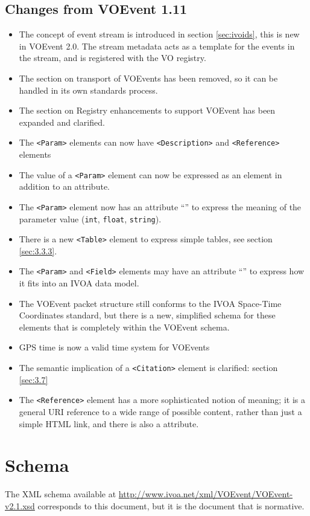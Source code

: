 \documentclass[11pt,a4paper]{ivoa}
\begin{document}
\subsection{Changes from VOEvent 1.11}
\begin{itemize}
\item The concept of event stream is introduced in section \ref{sec:ivoids}, this
is new in VOEvent 2.0. The stream metadata acts as a template for the events in
the stream, and is registered with the VO registry.
\item The section on transport of VOEvents has been removed, so it can be
handled in its own standards process.
\item The section on Registry enhancements to support VOEvent has been expanded
and clarified.
\item The \verb|<Param>| elements can now have \verb|<Description>| and
\verb|<Reference>| elements
\item The value of a \verb|<Param>| element can now be expressed as an element
in addition to an attribute.
\item The \verb|<Param>| element now has an attribute ``'' to
express the meaning of the parameter value (\texttt{int}, \texttt{float}, \texttt{string}).
\item There is a new \verb|<Table>| element to express simple tables, see section
\ref{sec:3.3.3}.
\item The \verb|<Param>| and \verb|<Field>| elements may have an attribute
``'' to express how it fits into an IVOA data model.
\item The VOEvent packet structure still conforms to the IVOA Space-Time
Coordinates standard, but there is a new, simplified schema for these elements
that is completely within the VOEvent schema.
\item GPS time is now a valid time system for VOEvents
\item The semantic implication of a \verb|<Citation>| element is clarified:
section \ref{sec:3.7}
\item The \verb|<Reference>| element has a more sophisticated notion of meaning;
it is a general URI reference to a wide range of possible content, rather than
just a simple HTML link, and there is also a  attribute.
\end{itemize}

\section{Schema}
\label{sec7}
The XML schema available at
\url{http://www.ivoa.net/xml/VOEvent/VOEvent-v2.1.xsd} corresponds to this
document, but it is the document that is normative.
\end{document}
